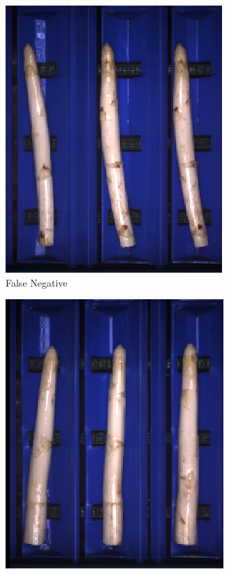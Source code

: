 \begin{figure}[!htb]
	\centering
	\begin{subfigure}{0.3\textwidth}
		\includegraphics[width=0.9\linewidth]{Figures/chapter04/bent_falsenegative_01.png}
		\vspace{-5pt}
		\caption{False Negative}
	\end{subfigure}
	\begin{subfigure}{0.3\textwidth}
		\includegraphics[width=0.9\linewidth]{Figures/chapter04/bent_falsenegative_02.png}

\end{subfigure}
\end{figure}
